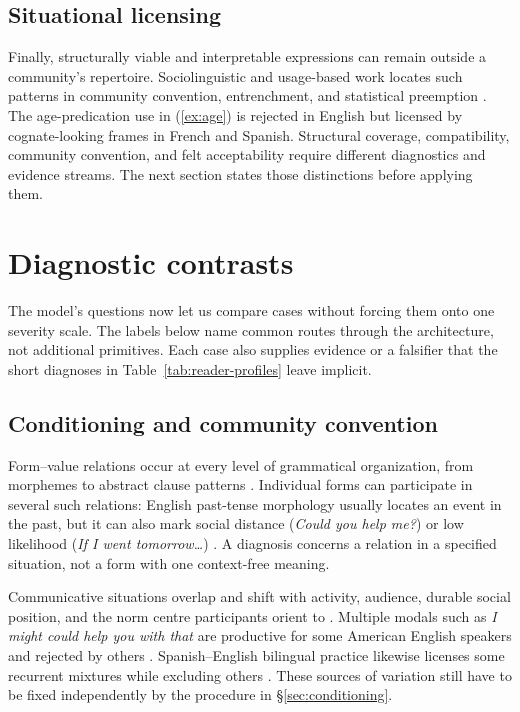 \documentclass[12pt,letterpaper]{article}
\newcommand{\mention}[1]{\textit{#1}}
\begin{document}
\subsection{Situational licensing}\label{sec:impasse-licensing}

Finally, structurally viable and interpretable expressions can remain outside a
community's repertoire. Sociolinguistic and usage-based work locates such
patterns in community convention, entrenchment, and statistical preemption
\autocite{labov1972,bybee2006,Goldberg2011}. The age-predication use in
(\ref{ex:age}) is rejected in English but licensed by cognate-looking frames in
French and Spanish. Structural coverage, compatibility, community convention,
and felt acceptability require different diagnostics and evidence
streams. The next section states those distinctions before applying them.



\section{Diagnostic contrasts}\label{sec:core-components}

The model's questions now let us compare cases without forcing them onto one
severity scale. The labels below name common routes through the architecture,
not additional primitives. Each case also supplies evidence or a falsifier that
the short diagnoses in Table~\ref{tab:reader-profiles} leave implicit.

\subsection{Conditioning and community convention}

Form--value relations occur at every level of grammatical organization, from
morphemes to abstract clause patterns \autocite{goldberg1995constructions}.
Individual forms can participate in several such relations: English past-tense
morphology usually locates an event in the past, but it can also mark social
distance (\mention{Could you help me?}) or low likelihood (\mention{If I went
tomorrow\dots}) \autocite{Kilgarriff2004}. A diagnosis concerns a
relation in a specified situation, not a form with one context-free meaning.

Communicative situations overlap and shift with activity, audience, durable
social position, and the norm centre participants orient to
\autocite[3]{wiese2023}. Multiple modals such as
\mention{I might could help you with that} are productive for some American
English speakers and rejected by others \autocite{morin2024semantics}.
Spanish--English bilingual practice likewise licenses some recurrent mixtures
while excluding others \autocite{Toribio2001}. These sources of variation still
have to be fixed independently by the procedure in \S\ref{sec:conditioning}.
\end{document}
